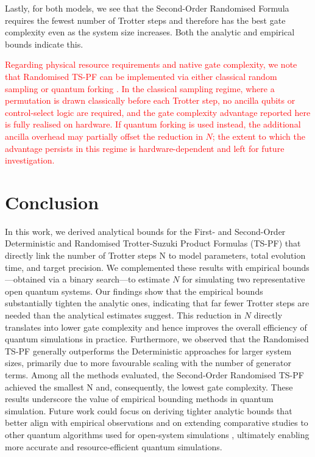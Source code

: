 \documentclass[pdflatex,sn-mathphys-num]{sn-jnl}%
\begin{document}
Lastly, for both models, we see that the Second-Order Randomised Formula requires the fewest number of Trotter steps and therefore has the best gate complexity even as the system size increases. Both the analytic and empirical bounds indicate this.  


\textcolor{red}{Regarding physical resource requirements and native gate complexity, we note that Randomised TS-PF can be implemented via either classical random sampling or quantum forking \cite{david2024faster}. In the classical sampling regime, where a permutation is drawn classically
before each Trotter step, no ancilla qubits or control-select logic are required, and the gate
complexity advantage reported here is fully realised on hardware. If quantum forking is used instead,
the additional ancilla overhead may partially offset the reduction in $N$; the extent to which the
advantage persists in this regime is hardware-dependent and left for future investigation.}

\section{Conclusion}\label{sec5}

In this work, we derived analytical bounds for the First- and Second-Order Deterministic and Randomised Trotter-Suzuki Product Formulas (TS-PF) that directly link the number of Trotter steps N to model parameters, total evolution time, and target precision. We complemented these results with empirical bounds—obtained via a binary search—to estimate $N$ for simulating two representative open quantum systems. Our findings show that the empirical bounds substantially tighten the analytic ones, indicating that far fewer Trotter steps are needed than the analytical estimates suggest. This reduction in $N$ directly translates into lower gate complexity and hence improves the overall efficiency of quantum simulations in practice. Furthermore, we observed that the Randomised TS-PF generally outperforms the Deterministic approaches for larger system sizes, primarily due to more favourable scaling with the number of generator terms. Among all the methods evaluated, the Second-Order Randomised TS-PF achieved the smallest N and, consequently, the lowest gate complexity. These results underscore the value of empirical bounding methods in quantum simulation. Future work could focus on deriving tighter analytic bounds that better align with empirical observations and on extending comparative studies to other quantum algorithms used for open-system simulations \cite{cleve2016efficient,childs2017efficient,li2022simulating,pocrnic2023quantum}, ultimately enabling more accurate and resource-efficient quantum simulations.
\newpage
\end{document}
